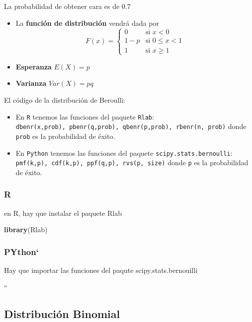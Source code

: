 \documentclass[
]{article}
\newenvironment{Shaded}{\begin{snugshade}}{\end{snugshade}}
\newcommand{\FunctionTok}[1]{\textcolor[rgb]{0.13,0.29,0.53}{\textbf{#1}}}
\newcommand{\NormalTok}[1]{#1}
\providecommand{\tightlist}{%
  \setlength{\itemsep}{0pt}\setlength{\parskip}{0pt}}
\begin{document}
La probabilidad de obtener cara es de 0.7

\begin{itemize}
\tightlist
\item
  La \textbf{función de distribución} vendrá dada por \[F(x) = \left\{
  \begin{array}{rl}
     0 & \text{si } x<0 
  \\ 1-p & \text{si } 0\le x<1
  \\ 1 & \text{si } x\ge 1
  \end{array}
  \right.\]
\item
  \textbf{Esperanza} \(E(X) = p\)
\item
  \textbf{Varianza} \(Var(X) = pq\)
\end{itemize}

El código de la distribución de Beroulli:

\begin{itemize}
\tightlist
\item
  En \texttt{R} tenemos las funciones del paquete \texttt{Rlab}:
  \texttt{dbenr(x,prob),\ pbenr(q,prob),\ qbenr(p,prob),\ rbenr(n,\ prob)}
  donde \texttt{prob} es la probabilidad de éxito.
\item
  En \texttt{Python} tenemos las funciones del paquete
  \texttt{scipy.stats.bernoulli}:
  \texttt{pmf(k,p),\ cdf(k,p),\ ppf(q,p),\ rvs(p,\ size)} donde
  \texttt{p} es la probabilidad de éxito.
\end{itemize}

\hypertarget{r}{%
\subsubsection{R}\label{r}}

en R, hay que instalar el paquete Rlab

\begin{Shaded}
\begin{Highlighting}[]
\FunctionTok{library}\NormalTok{(Rlab)}
\end{Highlighting}
\end{Shaded}

\hypertarget{python}{%
\subsubsection{PYthon`}\label{python}}

Hay que importar las funciones del paqute scipy.stats.bernouilli

``

\hypertarget{distribuciuxf3n-binomial}{%
\subsection{Distribución Binomial}\label{distribuciuxf3n-binomial}}
\end{document}
